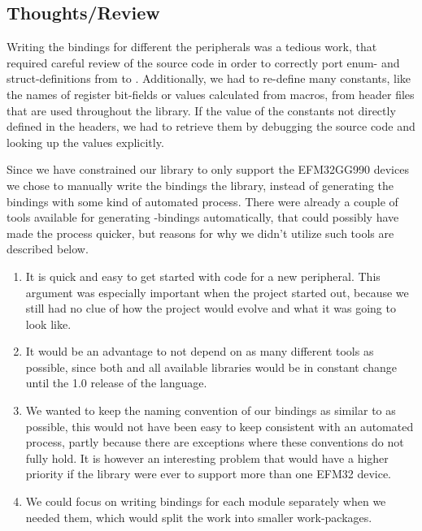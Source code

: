 \subsection{Thoughts/Review}

Writing the bindings for different the peripherals was a tedious work, that required careful review
of the \emlib source code in order to correctly port enum- and struct-definitions from \C to \rust.
Additionally, we had to re-define many constants, like the names of register bit-fields or values
calculated from \C macros, from header files that are used throughout the library. If the value of
the constants not directly defined in the headers, we had to retrieve them by debugging the source
code and looking up the values explicitly.

Since we have constrained our library to only support the EFM32GG990 devices we chose to manually
write the bindings the library, instead of generating the bindings with some kind of automated
process. There were already a couple of tools available for generating \C-bindings automatically,
that could possibly have made the process quicker, but reasons for why we didn't utilize such tools
are described below.

\begin{enumerate}
    \item It is quick and easy to get started with code for a new peripheral. This argument was
    especially important when the project started out, because we still had no clue of how the
    project would evolve and what it was going to look like.
    \item It would be an advantage to not depend on as many different tools as possible, since both
    \rust and all available libraries would be in constant change until the 1.0 release of the
    language.
    \item We wanted to keep the naming convention of our bindings as similar to \emlib as possible,
    this would not have been easy to keep consistent with an automated process, partly because there
    are exceptions where these conventions do not fully hold. It is however an interesting problem
    that would have a higher priority if the library were ever to support more than one EFM32
    device.
    \item We could focus on writing bindings for each module separately when we needed them, which
    would split the work into smaller work-packages.
\end{enumerate}
